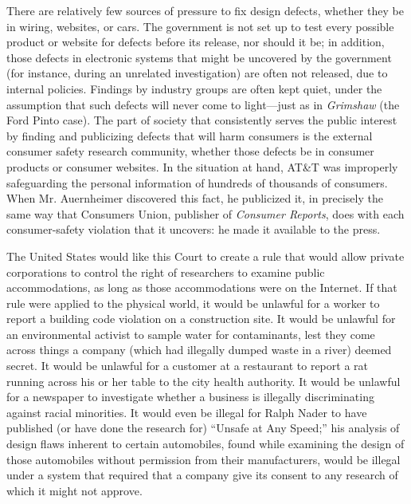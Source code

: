 \documentclass{article}
\begin{document}
	There are relatively few sources of pressure to fix design defects, whether they be in wiring, websites, or cars. The government is not set up to test every possible product or website for defects before its release, nor should it be; in addition, those defects in electronic systems that might be uncovered by the government (for instance, during an unrelated investigation) are often not released, due to internal policies. Findings by industry groups are often kept quiet, under the assumption that such defects will never come to light---just as in \emph{Grimshaw} (the Ford Pinto case). The part of society that consistently serves the public interest by finding and publicizing defects that will harm consumers is the external consumer safety research community, whether those defects be in consumer products or consumer websites. In the situation at hand, AT\&T was improperly safeguarding the personal information of hundreds of thousands of consumers. When Mr. Auernheimer discovered this fact, he publicized it, in precisely the same way that Consumers Union, publisher of \emph{Consumer Reports}, does with each consumer-safety violation that it uncovers: he made it available to the press.
		
	The United States would like this Court to create a rule that would allow private corporations to control the right of researchers to examine public accommodations, as long as those accommodations were on the Internet. If that rule were applied to the physical world, it would be unlawful for a worker to report a building code violation on a construction site. It would be unlawful for an environmental activist to sample water for contaminants, lest they come across things a company (which had illegally dumped waste in a river) deemed secret. It would be unlawful for a customer at a restaurant to report a rat running across his or her table to the city health authority. It would be unlawful for a newspaper to investigate whether a business is illegally discriminating against racial minorities. It would even be illegal for Ralph Nader to have published (or have done the research for) ``Unsafe at Any Speed;'' his analysis of design flaws inherent to certain automobiles, found while examining the design of those automobiles without permission from their manufacturers, would be illegal under a system that required that a company give its consent to any research of which it might not approve. 
	
\end{document}
